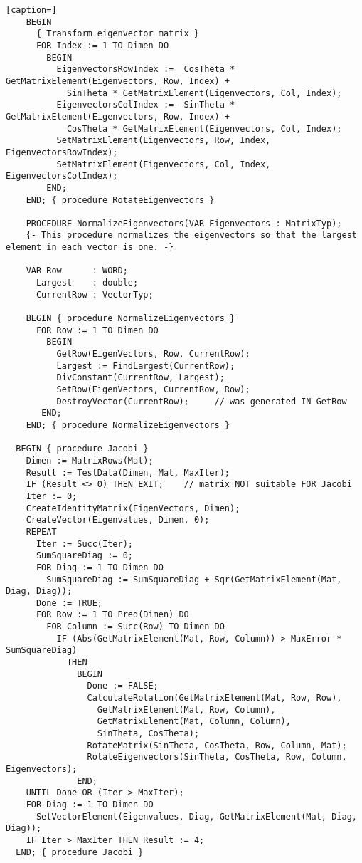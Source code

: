 \begin{lstlisting}[caption=]
    BEGIN
      { Transform eigenvector matrix }
      FOR Index := 1 TO Dimen DO
        BEGIN
          EigenvectorsRowIndex :=  CosTheta * GetMatrixElement(Eigenvectors, Row, Index) +
            SinTheta * GetMatrixElement(Eigenvectors, Col, Index);
          EigenvectorsColIndex := -SinTheta * GetMatrixElement(Eigenvectors, Row, Index) +
            CosTheta * GetMatrixElement(Eigenvectors, Col, Index);
          SetMatrixElement(Eigenvectors, Row, Index, EigenvectorsRowIndex);
          SetMatrixElement(Eigenvectors, Col, Index, EigenvectorsColIndex);
        END;
    END; { procedure RotateEigenvectors }

    PROCEDURE NormalizeEigenvectors(VAR Eigenvectors : MatrixTyp);
    {- This procedure normalizes the eigenvectors so that the largest element in each vector is one. -}

    VAR Row      : WORD;
      Largest    : double;
      CurrentRow : VectorTyp;

    BEGIN { procedure NormalizeEigenvectors }
      FOR Row := 1 TO Dimen DO
        BEGIN
          GetRow(EigenVectors, Row, CurrentRow);
          Largest := FindLargest(CurrentRow);
          DivConstant(CurrentRow, Largest);
          SetRow(EigenVectors, CurrentRow, Row);
          DestroyVector(CurrentRow);     // was generated IN GetRow
       END;
    END; { procedure NormalizeEigenvectors }

  BEGIN { procedure Jacobi }
    Dimen := MatrixRows(Mat);
    Result := TestData(Dimen, Mat, MaxIter);
    IF (Result <> 0) THEN EXIT;    // matrix NOT suitable FOR Jacobi
    Iter := 0;
    CreateIdentityMatrix(EigenVectors, Dimen);
    CreateVector(Eigenvalues, Dimen, 0);
    REPEAT
      Iter := Succ(Iter);
      SumSquareDiag := 0;
      FOR Diag := 1 TO Dimen DO
        SumSquareDiag := SumSquareDiag + Sqr(GetMatrixElement(Mat, Diag, Diag));
      Done := TRUE;
      FOR Row := 1 TO Pred(Dimen) DO
        FOR Column := Succ(Row) TO Dimen DO
          IF (Abs(GetMatrixElement(Mat, Row, Column)) > MaxError * SumSquareDiag)
            THEN
              BEGIN
                Done := FALSE;
                CalculateRotation(GetMatrixElement(Mat, Row, Row),
                  GetMatrixElement(Mat, Row, Column),
                  GetMatrixElement(Mat, Column, Column),
                  SinTheta, CosTheta);
                RotateMatrix(SinTheta, CosTheta, Row, Column, Mat);
                RotateEigenvectors(SinTheta, CosTheta, Row, Column, Eigenvectors);
              END;
    UNTIL Done OR (Iter > MaxIter);
    FOR Diag := 1 TO Dimen DO
      SetVectorElement(Eigenvalues, Diag, GetMatrixElement(Mat, Diag, Diag));
    IF Iter > MaxIter THEN Result := 4;
  END; { procedure Jacobi }
\end{lstlisting}

